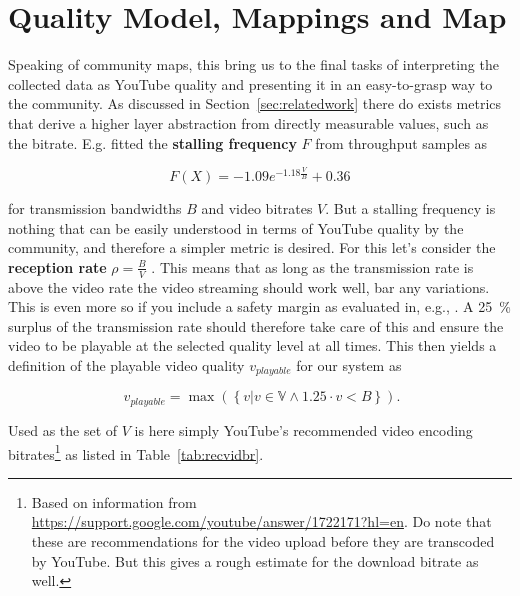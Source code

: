 \section{Quality Model, Mappings and Map}
\label{sec:qoe}

Speaking of community maps, this bring us to the final tasks of interpreting the collected data as YouTube quality and presenting it in an easy-to-grasp way to the community. As discussed in Section~\ref{sec:relatedwork} there do exists metrics that derive a higher layer abstraction from directly measurable values, such as the bitrate. E.g. \cite{hossfeld2011transport} fitted the \textbf{stalling frequency} $F$ from throughput samples as

\begin{equation*}
F(X) = -1.09 e^{-1.18 \frac{V}{B}} + 0.36
\end{equation*}

for transmission bandwidths $B$ and video bitrates $V$. But a stalling frequency is nothing that can be easily understood in terms of YouTube quality by the community, and therefore a simpler metric is desired. For this let's consider the \textbf{reception rate} $\rho = \frac{B}{V}$ \cite{Hossfeld2013}. This means that as long as the transmission rate is above the video rate the video streaming should work well, bar any variations. This is even more so if you include a safety margin as evaluated in, e.g., \cite{Zinner2015}. A \SI{25}{\percent} surplus of the transmission rate should therefore take care of this and ensure the video to be playable at the selected quality level at all times. This then yields a definition of the playable video quality $v_{playable}$ for our system as

\begin{equation*}
\phantom{\text{.}} v_{playable} = \max\left(\left\{ v | v \in \mathbb{V} \wedge 1.25 \cdot v < B \right\}\right) \text{.}
\end{equation*}

Used as the set of $V$ is here simply YouTube's recommended video encoding bitrates\footnote{Based on information from \url{https://support.google.com/youtube/answer/1722171?hl=en}. Do note that these are recommendations for the video upload before they are transcoded by YouTube. But this gives a rough estimate for the download bitrate as well.} as listed in Table~\ref{tab:recvidbr}.

